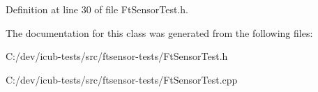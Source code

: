Definition at line 30 of file Ft\+Sensor\+Test.\+h.



The documentation for this class was generated from the following files\+:\begin{DoxyCompactItemize}
\item 
C\+:/dev/icub-\/tests/src/ftsensor-\/tests/Ft\+Sensor\+Test.\+h\item 
C\+:/dev/icub-\/tests/src/ftsensor-\/tests/Ft\+Sensor\+Test.\+cpp\end{DoxyCompactItemize}

